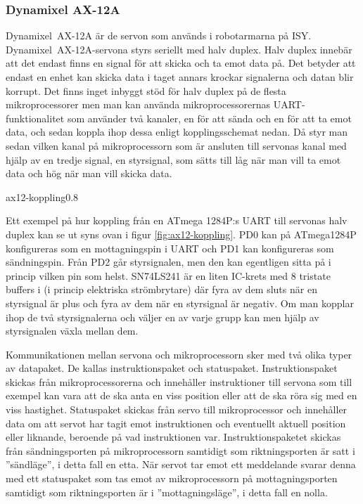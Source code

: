 \documentclass[a4paper,12pt]{article}
\begin{document}
\subsubsection{Dynamixel AX-12A}
 
Dynamixel~AX-12A är de servon som används i robotarmarna på ISY. Dynamixel~AX-12A-servona styrs seriellt med halv duplex. Halv duplex innebär att det endast finns en signal för att skicka och ta emot data på. Det betyder att endast en enhet kan skicka data i taget annars krockar signalerna och datan blir korrupt. Det finns inget inbyggt stöd för halv duplex på de flesta mikroprocessorer men man kan använda mikroprocessorernas UART-funktionalitet som använder två kanaler, en för att sända och en för att ta emot data, och sedan koppla ihop dessa enligt kopplingsschemat nedan. Då styr man sedan vilken kanal på mikroprocessorn som är ansluten till servonas kanal med hjälp av en tredje signal, en styrsignal,  som sätts till låg när man vill ta emot data och hög när man vill skicka data. 
 
 {ax12-koppling}{0.8} 

Ett exempel på hur koppling från en ATmega 1284P:s UART till servonas halv duplex kan se ut syns ovan i figur \ref{fig:ax12-koppling}. PD0 kan på ATmega1284P konfigureras som en mottagningspin i UART och PD1 kan konfigureras som sändningspin. Från PD2 går styrsignalen, men den kan egentligen sitta på i princip vilken pin som helst. SN74LS241 är en liten IC-krets med 8 tristate buffers i (i princip elektriska strömbrytare) där fyra av dem sluts när en styrsignal är plus och fyra av dem när en styrsignal är negativ. Om man kopplar ihop de två styrsignalerna och väljer en av varje grupp kan men hjälp av styrsignalen växla mellan dem.\cite{dyn-manual}
 
Kommunikationen mellan servona och mikroprocessorn sker med två olika typer av datapaket. De kallas instruktionspaket och statuspaket. Instruktionspaket skickas från mikroprocessorerna och innehåller instruktioner till servona som till exempel kan vara att de ska anta en viss position eller att de ska röra sig med en viss hastighet. Statuspaket skickas från servo till mikroprocessor och innehåller data om att servot har tagit emot instruktionen och eventuellt aktuell position eller liknande, beroende på vad instruktionen var. Instruktionspaketet skickas från sändningsporten på mikroprocessorn samtidigt som riktningsporten är satt i ''sändläge'', i detta fall en etta. När servot tar emot ett meddelande svarar denna med ett statuspaket som tas emot av mikroprocessorn på mottagningsporten samtidigt som riktningsporten är i ''mottagningsläge'', i detta fall en nolla. 
\end{document}
